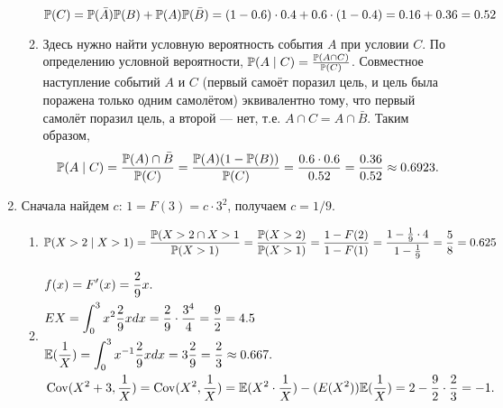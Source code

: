 \documentclass[pdftex,12pt,a4paper]{article}
\begin{document}
\begin{enumerate}
\begin{enumerate}
\begin{equation}
\P(C)=\P(\bar{A})\P(B)+\P(A)\P(\bar{B})=(1-0.6)\cdot 0.4+0.6\cdot (1-0.4)=0.16+0.36=0.52
\end{equation}
\item Здесь нужно найти условную вероятность события $A$ при условии $C$. По определению условной вероятности, $\P(A\mid C)=\frac{\P(A\cap C)}{\P(C)}$. Совместное наступление событий $A$ и $C$ (первый самоёт поразил цель, и цель была поражена только одним самолётом) эквивалентно тому, что первый самолёт поразил цель, а второй --- нет, т.е. $A\cap C=A\cap \bar{B}$. Таким образом,
\begin{equation}
\P(A\mid C)=\frac{\P(A)\cap \bar{B}}{\P(C)}=\frac{\P(A)(1-\P(B))}{\P(C)}=\frac{0.6\cdot 0.6}{0.52}=\frac{0.36}{0.52}\approx 0.6923.
\end{equation}
\end{enumerate}
\item Сначала найдем $c$: $1=F(3)=c\cdot 3^2$, получаем $c=1/9$.
\begin{enumerate}
\item 
\begin{equation}
\P(X>2\mid X>1)=\frac{\P(X>2\cap X>1}{\P(X>1)}=\frac{\P(X>2)}{\P(X>1)}=\frac{1-F(2)}{1-F(1)}=\frac{1-\frac{1}{9}\cdot 4}{1-\frac{1}{9}}=\frac{5}{8}=0.625
\end{equation}
\item 
\begin{align}
& f(x)=F'(x)=\frac{2}{9}x.\\
& EX=\int_0^3 x^2\frac{2}{9}x dx=\frac{2}{9}\cdot\frac{3^4}{4}=\frac{9}{2}=4.5\\
& \E(\frac{1}{X})=\int_0^3 x^{-1}\frac{2}{9}x dx=3\frac{2}{9}=\frac{2}{3}\approx 0.667.\\
& \Cov(X^2+3,\frac{1}{X})=\Cov(X^2,\frac{1}{X})=\E(X^2\cdot \frac{1}{X})-(E(X^2))\E(\frac{1}{X})=2-\frac{9}{2}\cdot \frac{2}{3}=-1.
\end{align}


\end{enumerate}
\end{enumerate}
\end{document}
